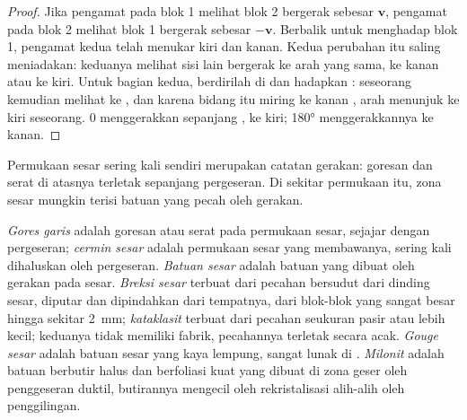 \begin{proof}
Jika pengamat pada blok 1 melihat blok 2 bergerak sebesar $\mathbf v$, pengamat pada blok 2 melihat blok 1 bergerak sebesar $-\mathbf v$. Berbalik untuk menghadap blok 1, pengamat kedua telah menukar kiri dan kanan. Kedua perubahan itu saling meniadakan: keduanya melihat sisi lain bergerak ke arah yang sama, ke kanan atau ke kiri. Untuk bagian kedua, berdirilah di  dan hadapkan : seseorang kemudian melihat ke , dan karena bidang itu miring ke kanan , arah  menunjuk ke kiri seseorang.  $0$ menggerakkan  sepanjang , ke kiri;  \ang{180} menggerakkannya ke kanan.
\end{proof}

Permukaan sesar sering kali sendiri merupakan catatan gerakan: goresan dan serat di atasnya terletak sepanjang pergeseran. Di sekitar permukaan itu, zona sesar mungkin terisi batuan yang pecah oleh gerakan.

\begin{definition}\label{def:b1:faults-folds-fabrics:fault-rocks}
\emph{Gores garis} adalah goresan atau serat pada permukaan sesar, sejajar dengan pergeseran; \emph{cermin sesar} adalah permukaan sesar yang membawanya, sering kali dihaluskan oleh pergeseran. \emph{Batuan sesar} adalah batuan yang dibuat oleh gerakan pada sesar. \emph{Breksi sesar} terbuat dari pecahan bersudut dari dinding sesar, diputar dan dipindahkan dari tempatnya, dari blok-blok yang sangat besar hingga sekitar \qty{2}{mm}; \emph{kataklasit} terbuat dari pecahan seukuran pasir atau lebih kecil; keduanya tidak memiliki fabrik, pecahannya terletak secara acak. \emph{Gouge sesar} adalah batuan sesar yang kaya lempung, sangat lunak di . \emph{Milonit} adalah batuan berbutir halus dan berfoliasi kuat yang dibuat di zona geser oleh penggeseran duktil, butirannya mengecil oleh rekristalisasi alih-alih oleh penggilingan.
\end{definition}

